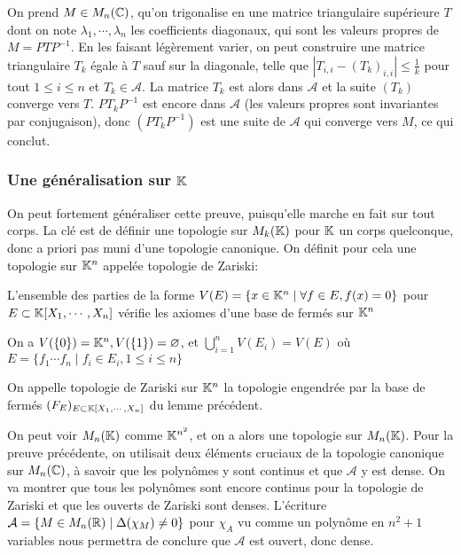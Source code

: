 \documentclass{article}
\begin{document}
On prend $M \in M_n(\mathbb{C})$, qu'on trigonalise en une matrice triangulaire supérieure $T$ dont on note $\lambda_1, \cdots, \lambda_n$ les coefficients diagonaux, qui sont les valeurs propres de $M = PTP^{-1}$. En les faisant légèrement varier, on peut construire une matrice triangulaire $T_k$ égale à $T$ sauf sur la diagonale, telle que $|T_{i,i} - (T_k)_{i, i}| \leq \frac{1}{k}$ pour tout $1 \leq i \leq n$ et $T_k \in \mathcal{A}$. La matrice $T_k$ est alors dans $\mathcal{A}$ et la suite $(T_k)$ converge vers $T$. $PT_kP^{-1}$ est encore dans $\mathcal{A}$ (les valeurs propres sont invariantes par conjugaison), donc $(PT_kP^{-1})$ est une suite de $\mathcal{A}$ qui converge vers $M$, ce qui conclut.\\

\subsubsection{Une généralisation sur $\mathbb{K}$}

On peut fortement généraliser cette preuve, puisqu'elle marche en fait sur tout corps. La clé est de définir une topologie sur $M_k(\mathbb{K})$ pour $\mathbb{K}$ un corps quelconque, donc a priori pas muni d'une topologie canonique. On définit pour cela une topologie sur $\mathbb{K}^n$ appelée topologie de Zariski:

\begin{lemme}
L'ensemble des parties de la forme $V(E) = \{x \in \mathbb{K}^n \mid \forall f \in E, f(x) = 0 \}$ pour $E \subset \mathbb{K}[X_1, \cdots, X_n]$ vérifie les axiomes d'une base de fermés sur $\mathbb{K}^n$
\end{lemme}

\begin{preuve}
On a $V(\{0\}) = \mathbb{K}^n, V(\{1\}) = \varnothing$, et $\bigcup_{i=1}^{n}{V(E_i)} = V(E)$ où $E = \{f_1\cdots f_n \mid f_i \in E_i, 1 \leq i \leq n\}$
\end{preuve}

\begin{definition}
On appelle topologie de Zariski sur $\mathbb{K}^n$ la topologie engendrée par la base de fermés $(F_E)_{E \subset  \mathbb{K}[X_1, \cdots, X_n]}$ du lemme précédent.
\end{definition}

On peut voir $M_n(\mathbb{K})$ comme $\mathbb{K}^{n^2}$, et on a alors une topologie sur $M_n(\mathbb{K})$. Pour la preuve précédente, on utilisait deux éléments cruciaux de la topologie canonique sur $M_n(\mathbb{C})$, à savoir que les polynômes y sont continus et que $\mathcal{A}$ y est dense. On va montrer que tous les polynômes sont encore continus pour la topologie de Zariski et que les ouverts de Zariski sont denses. L'écriture $\mathcal{A} = \{M \in M_n(\mathbb{R}) \mid \Delta(\chi_M) \neq 0\}$ pour $\chi_A$ vu comme un polynôme en $n^2 + 1$ variables nous permettra de conclure que $\mathcal{A}$ est ouvert, donc dense.
\end{document}
